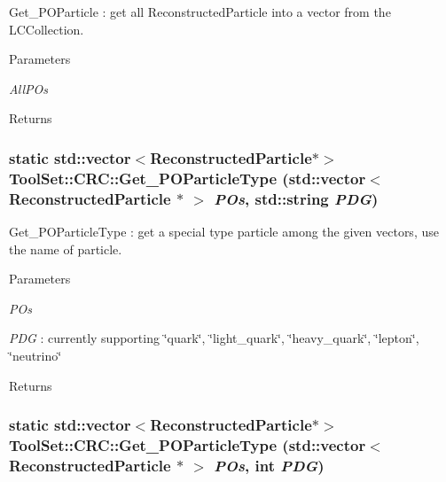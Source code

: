 Get\_\-POParticle : get all ReconstructedParticle into a vector from the LCCollection. 
\begin{DoxyParams}{Parameters}
\item[{\em AllPOs}]\end{DoxyParams}
\begin{DoxyReturn}{Returns}

\end{DoxyReturn}
\hypertarget{classToolSet_1_1CRC_a6250a525d48e3828cdc6d1544b3f7000}{
\subsubsection[{Get\_\-POParticleType}]{\setlength{\rightskip}{0pt plus 5cm}static std::vector$<$ReconstructedParticle$\ast$$>$ ToolSet::CRC::Get\_\-POParticleType (std::vector$<$ ReconstructedParticle $\ast$ $>$ {\em POs}, \/  std::string {\em PDG})}}
\label{classToolSet_1_1CRC_a6250a525d48e3828cdc6d1544b3f7000}


Get\_\-POParticleType : get a special type particle among the given vectors, use the name of particle. 
\begin{DoxyParams}{Parameters}
\item[{\em POs}]\item[{\em PDG}]: currently supporting \char`\"{}quark\char`\"{}, \char`\"{}light\_\-quark\char`\"{}, \char`\"{}heavy\_\-quark\char`\"{}, \char`\"{}lepton\char`\"{}, \char`\"{}neutrino\char`\"{}\end{DoxyParams}
\begin{DoxyReturn}{Returns}

\end{DoxyReturn}
\hypertarget{classToolSet_1_1CRC_ad8b6c46ab37661892183c313d5c0b3b3}{
\subsubsection[{Get\_\-POParticleType}]{\setlength{\rightskip}{0pt plus 5cm}static std::vector$<$ReconstructedParticle$\ast$$>$ ToolSet::CRC::Get\_\-POParticleType (std::vector$<$ ReconstructedParticle $\ast$ $>$ {\em POs}, \/  int {\em PDG})}}
\label{classToolSet_1_1CRC_ad8b6c46ab37661892183c313d5c0b3b3}


